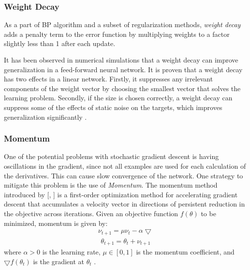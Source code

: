 \subsubsection{Weight Decay}


As a part of BP algorithm and a subset of regularization methods, \textit{weight decay} adds a penalty term to the error function by multiplying weights to a factor slightly less than 1 after each update. 

 It has been observed in numerical simulations that a weight decay can improve generalization in a feed-forward neural network. It is proven that a weight decay has two effects in a linear network. Firstly, it suppresses any irrelevant components of the weight vector by choosing the smallest vector that solves the learning problem. Secondly, if the size is chosen correctly, a weight decay can suppress some of the effects of static noise on the targets, which improves generalization significantly \cite{moody1995simple}. 

\subsubsection{Momentum}
One of the potential problems with stochastic gradient descent is having oscillations in the gradient, since not all examples are used for each calculation of the derivatives. This can cause slow convergence of the network. One strategy to mitigate this problem is the use of \textit{Momentum}. The momentum method introduced by [\citeauthor{polyak1964some}, \citeyear{polyak1964some}] is a first-order optimization method for accelerating gradient descent that accumulates a velocity vector in directions of persistent reduction in the objective across iterations. Given an objective function $f(\theta)$ to be minimized, momentum is given by:
\begin{equation}
	\label{eq:t}
	\begin{aligned}
		\nu_{t+1} = \mu\nu_t - \alpha\bigtriangledown 
	\end{aligned}
\end{equation}
\begin{equation}
	\label{eq:t}
	\begin{gathered}
	\theta_{t+1} = \theta_t + \nu_{t + 1}
	\end{gathered}
\end{equation}
where $\alpha > 0$ is the learning rate, $\mu \in [0,1]$ is the momentum coefficient, and $\bigtriangledown f(\theta_t)$ is the gradient at $\theta_t$ \cite{sutskever2013importance}. 

